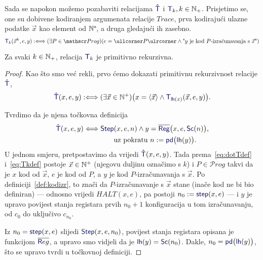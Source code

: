 Sada se napokon možemo pozabaviti relacijama $\f{\hat T}$ i $\f T_k,k\in\N_+$. Prisjetimo se, one su dobivene kodiranjem argumenata relacije $Trace$, prva kodirajući ulazne podatke $\vec x$ kao element od ${\mathbb N}^*\!$, a druga gledajući ih zasebno. 
\begin{equation}\label{eq:Tkdef}
    \f T_k(\vec x^k,e,y):\Longleftrightarrow(\exists P\in\mathscr Prog)(e=\kprog{P}\land \text{"$y$ je kod $P$-izračunavanja s $\vec x$"})
\end{equation}

\begin{propozicija}[{name=[primitivna rekurzivnost Kleenejeve relacije]}]\label{prop:Tkprn}
Za svaki $k\in{\mathbb N}_+$, relacija $\f T_k$ je primitivno rekurzivna.
\end{propozicija}
\begin{proof}
Kao što smo već rekli, prvo ćemo dokazati primitivnu rekurzivnost relacije $\f{\hat T}$,
\begin{equation}\label{eq:dotTdef}
    \f{\hat T}(x,e,y):\Longleftrightarrow(\exists\vec x\in\N^+)\bigl(x=\langle\vec x\rangle\land\f T_{\f{lh}(x)}(\vec x,e,y)\bigr)\text.
\end{equation}

Tvrdimo da je njena točkovna definicija
\begin{align*}
    \hat{\f T}(x,e,y)\Longleftrightarrow\f{Step}&(x,e,n)\land y=\overline{\f{Reg}}\bigl(x,e,\f{Sc}(n)\bigr)\text,\\
    &\text{uz pokratu }n:=\f{pd}\big(\f{lh}(y)\bigr)\text.
\end{align*}
U jednom smjeru, pretpostavimo da vrijedi $\f{\hat T}(x,e,y)$. Tada prema~\eqref{eq:dotTdef} i~\eqref{eq:Tkdef} postoje $\vec x\in{\mathbb N}^+$ (njegovu duljinu označimo s $k$) i $P\in\mathscr Prog$ takvi da je $x$ kod od $\vec x$, $e$ je kod od $P$, a $y$ je kod $P$-izračunavanja s $\vec x$. Po definiciji~\ref{def:kodizr}, to znači da $P$-izračunavanje s $\vec x$ stane (inače kod ne bi bio definiran) --- odnosno vrijedi $HALT(x,e)$, pa postoji $n_0:=\f{step}(x,e)$ --- i $y$ je upravo povijest stanja registara prvih $n_0+1$ konfiguracija u tom izračunavanju, od $c_0$ do uključivo $c_{n_0}$.

Iz $n_0=\f{step}(x,e)$ slijedi $\f{Step}(x,e,n_0)$, povijest stanja registara opisana je funkcijom $\overline{\f Reg}$, a upravo smo vidjeli da je $\f{lh}(y)=\f{Sc}(n_0)$. Dakle, $n_0=\f{pd}\bigl(\f{lh}(y)\bigr)$, što se upravo tvrdi u točkovnoj definiciji.


\end{proof}

